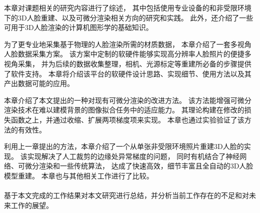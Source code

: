 本章对课题相关的研究内容进行了综述，
其中包括使用专业设备的和非受限环境下的3D人脸重建、以及可微分渲染相关方向的研究和实践。
此外，还介绍了一些可用于3D人脸渲染的计算机图形学的基础知识。

为了更专业地采集基于物理的人脸渲染所需的材质数据，
本章介绍了一套多视角人脸数据采集方案。
该方案中定制的软硬件能够实现高分辨率人脸照片的便捷多视角采集，
并为后续的数据收集整理，相机、光源标定等重建所必备的步骤提供了软件支持。
本章将介绍该平台的软硬件设计思路、实现细节、使用方法以及其产出数据可能的应用。

本章介绍了本文提出的一种对现有可微分渲染的改进方法。
该方法能增强可微分渲染技术在难以建模背景的图像拟合任务中的适应能力。
其理论构建在修改的损失函数之上，并通过收缩、扩展两项梯度项来实现。
本章也通过实验验证了该方法的有效性。

利用上一章提出的方法，本章介绍了一个从单张非受限环境照片重建3D人脸的实现。
该实现解决了人工裁剪的边缘处异常梯度的问题，
同时有机结合了神经网络、可微分渲染和一些传统算法，
达成了快速高效，细节丰富且全自动的3D人脸模型重建。
本章也与其他相关工作进行了比较。

\paragraph{}
基于本文完成的工作结果对本文研究进行总结，并分析当前工作存在的不足和对未来工作的展望。

